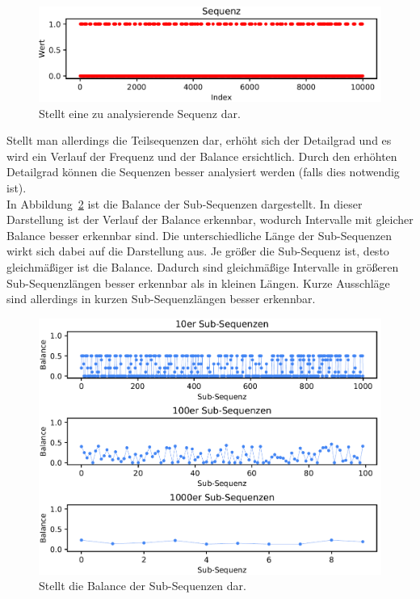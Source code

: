 \begin{figure}[H]
	\includegraphics[width=\linewidth]{pythonImplementation/images/example_subsequences_main.PNG}
	\caption[Darstellung einer zu analysierenden Sequenz]{Stellt eine zu analysierende Sequenz dar\footnotemark.}
	\label{fig:example_subsequence}
\end{figure}

Stellt man allerdings die Teilsequenzen dar, erhöht sich der Detailgrad und es wird ein Verlauf der Frequenz und der Balance ersichtlich.
Durch den erhöhten Detailgrad können die Sequenzen besser analysiert werden (falls dies notwendig ist).
\\
In Abbildung~\ref{fig:example_subsequence_balances} ist die Balance der Sub-Sequenzen dargestellt.
In dieser Darstellung ist der Verlauf der Balance erkennbar, wodurch Intervalle mit gleicher Balance besser erkennbar sind.
Die unterschiedliche Länge der Sub-Sequenzen wirkt sich dabei auf die Darstellung aus.
Je größer die Sub-Sequenz ist, desto gleichmäßiger ist die Balance.
Dadurch sind gleichmäßige Intervalle in größeren Sub-Sequenzlängen besser erkennbar als in kleinen Längen.
Kurze Ausschläge sind allerdings in kurzen Sub-Sequenzlängen besser erkennbar.

\begin{figure}[H]
	\includegraphics[width=\linewidth]{pythonImplementation/images/example_subsequences_balances.PNG}
	\caption[Darstellung der Sub-Sequenzen im Bezug auf die Balance]{Stellt die Balance der Sub-Sequenzen dar\footnotemark.}
	\label{fig:example_subsequence_balances}
\end{figure}

